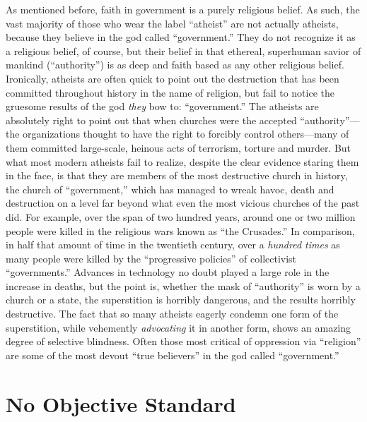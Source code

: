\documentclass{book}
\begin{document}
As mentioned before, faith in government is a purely religious belief. As such, the vast majority of those who wear the label \enquote{atheist} are not actually atheists, because they believe in the god called \enquote{government.} They do not recognize it as a religious belief, of course, but their belief in that ethereal, superhuman savior of mankind (\enquote{authority}) is as deep and faith based as any other religious belief. Ironically, atheists are often quick to point out the destruction that has been committed throughout history in the name of religion, but fail to notice the gruesome results of the god \emph{they} bow to: \enquote{government.} The atheists are absolutely right to point out that when churches were the accepted \enquote{authority}---the organizations thought to have the right to forcibly control others---many of them committed large-scale, heinous acts of terrorism, torture and murder. But what most modern atheists fail to realize, despite the clear evidence staring them in the face, is that they are members of the most destructive church in history, the church of \enquote{government,} which has managed to wreak havoc, death and destruction on a level far beyond what even the most vicious churches of the past did. For example, over the span of two hundred years, around one or two million people were killed in the religious wars known as \enquote{the Crusades.} In comparison, in half that amount of time in the twentieth century, over a \emph{hundred times} as many people were killed by the \enquote{progressive policies} of collectivist \enquote{governments.} Advances in technology no doubt played a large role in the increase in deaths, but the point is, whether the mask of \enquote{authority} is worn by a church or a state, the superstition is horribly dangerous, and the results horribly destructive. The fact that so many atheists eagerly condemn one form of the superstition, while vehemently \emph{advocating} it in another form, shows an amazing degree of selective blindness. Often those most critical of oppression via \enquote{religion} are some of the most devout \enquote{true believers} in the god called \enquote{government.}

\section{No Objective Standard}
\end{document}
